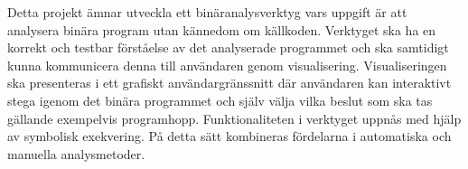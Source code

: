 Detta projekt ämnar utveckla ett binäranalysverktyg vars uppgift är att
analysera binära program utan kännedom om källkoden. Verktyget ska ha en korrekt
och testbar förståelse av det analyserade programmet och ska samtidigt kunna
kommunicera denna till användaren genom visualisering. Visualiseringen ska
presenteras i ett grafiskt användargränssnitt där användaren kan interaktivt
stega igenom det binära programmet och själv välja vilka beslut som ska tas
gällande exempelvis programhopp. Funktionaliteten i verktyget uppnås med hjälp av symbolisk exekvering. På detta
sätt kombineras fördelarna i automatiska och manuella analysmetoder.





